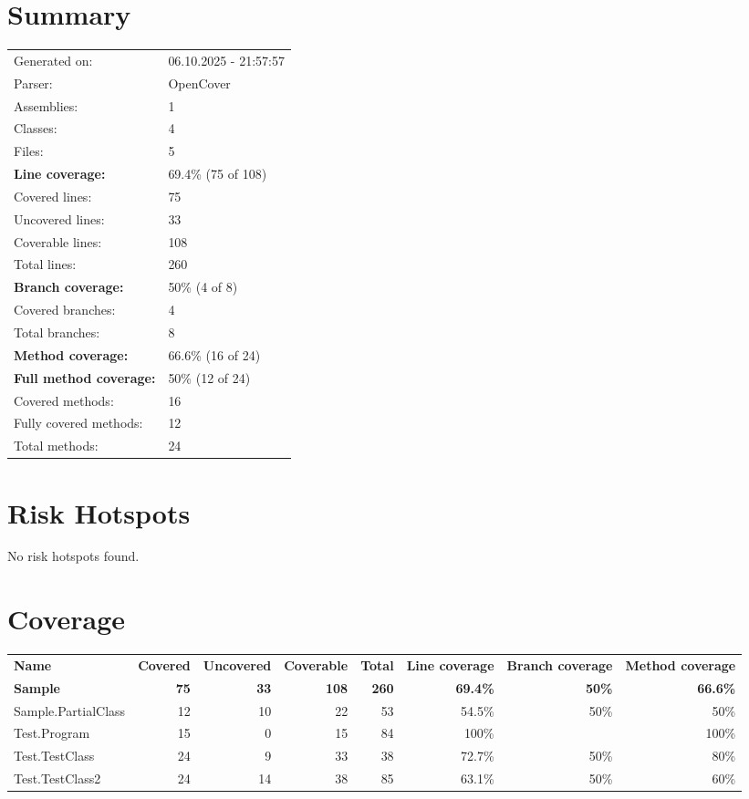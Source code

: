 \documentclass[a4paper,landscape,10pt]{article}
\begin{document}
\setcounter{secnumdepth}{-1}
\section{Summary}
\begin{longtable}[l]{ll}
Generated on: & 06.10.2025 - 21:57:57\\
Parser: & OpenCover\\
Assemblies: & 1\\
Classes: & 4\\
Files: & 5\\
\textbf{Line coverage:} & 69.4\% (75 of 108)\\
Covered lines: & 75\\
Uncovered lines: & 33\\
Coverable lines: & 108\\
Total lines: & 260\\
\textbf{Branch coverage:} & 50\% (4 of 8)\\
Covered branches: & 4\\
Total branches: & 8\\
\textbf{Method coverage:} & 66.6\% (16 of 24)\\
\textbf{Full method coverage:} & 50\% (12 of 24)\\
Covered methods: & 16\\
Fully covered methods: & 12\\
Total methods: & 24\\
\end{longtable}
\section{Risk Hotspots}
No risk hotspots found.
\section{Coverage}
\begin{longtable}[l]{|l|r|r|r|r|r|r|r|}
\textbf{Name} & \textbf{Covered} & \textbf{Uncovered} & \textbf{Coverable} & \textbf{Total} & \textbf{Line coverage} & \textbf{Branch coverage} & \textbf{Method coverage}\\
\textbf{Sample} & \textbf{75} & \textbf{33} & \textbf{108} & \textbf{260} & \textbf{69.4\%} & \textbf{50\%} & \textbf{66.6\%}\\
Sample.PartialClass & 12 & 10 & 22 & 53 & 54.5\% & 50\% & 50\%\\
Test.Program & 15 & 0 & 15 & 84 & 100\% &  & 100\%\\
Test.TestClass & 24 & 9 & 33 & 38 & 72.7\% & 50\% & 80\%\\
Test.TestClass2 & 24 & 14 & 38 & 85 & 63.1\% & 50\% & 60\%\\
\end{longtable}
\end{document}
